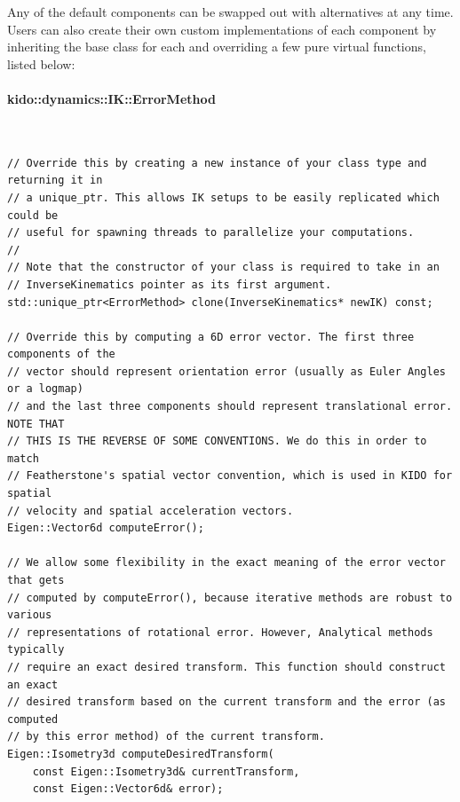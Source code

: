 Any of the default components can be swapped out with alternatives at any time. Users can also create their own custom implementations of each component by inheriting the base class for each and overriding a few pure virtual functions, listed below:

\paragraph{kido::dynamics::IK::ErrorMethod} \
\begin{lstlisting}
// Override this by creating a new instance of your class type and returning it in
// a unique_ptr. This allows IK setups to be easily replicated which could be 
// useful for spawning threads to parallelize your computations.
//
// Note that the constructor of your class is required to take in an 
// InverseKinematics pointer as its first argument.
std::unique_ptr<ErrorMethod> clone(InverseKinematics* newIK) const;

// Override this by computing a 6D error vector. The first three components of the
// vector should represent orientation error (usually as Euler Angles or a logmap)
// and the last three components should represent translational error. NOTE THAT
// THIS IS THE REVERSE OF SOME CONVENTIONS. We do this in order to match 
// Featherstone's spatial vector convention, which is used in KIDO for spatial 
// velocity and spatial acceleration vectors.
Eigen::Vector6d computeError();

// We allow some flexibility in the exact meaning of the error vector that gets
// computed by computeError(), because iterative methods are robust to various
// representations of rotational error. However, Analytical methods typically
// require an exact desired transform. This function should construct an exact
// desired transform based on the current transform and the error (as computed
// by this error method) of the current transform.
Eigen::Isometry3d computeDesiredTransform(
    const Eigen::Isometry3d& currentTransform,
    const Eigen::Vector6d& error);
\end{lstlisting}

